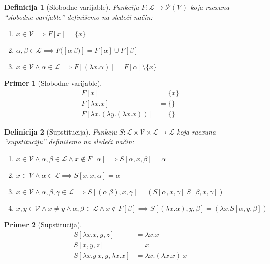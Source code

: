 \documentclass[10pt,a4paper,oneside]{article}
\newtheorem*{definition}{Definicija}
\newtheorem*{primer}{Primer}
\begin{document}
    \begin{definition}[Slobodne varijable]
      Funkciju \(F : \mathcal{L} \to \mathcal{P}(\mathcal{V})\) koja racxuna ``slobodne varijable'' defini\v{s}emo na slede\'{c}i na\v{c}in:
      \begin{enumerate}
        \item
          \(
            x \in \mathcal{V} \implies
            F[x] = \{x\}
          \)
        \item
          \(
            \alpha, \beta \in \mathcal{L} \implies
            F([\alpha\ \beta)] = F[\alpha] \cup F[\beta]
          \)
        \item
          \(
            x \in \mathcal{V} \land
            \alpha \in \mathcal{L} \implies
            F[(\lambda x.\alpha)] = F[\alpha] \setminus \{x\}
          \)
      \end{enumerate}
    \end{definition}
    \begin{primer}[Slobodne varijable]
      \begin{align*}
        F[x] &= \{x\}\\
        F[\lambda x.x] &= \{\}\\
        F[\lambda x.(\lambda y.(\lambda x.x))] &= \{\}
      \end{align*}
    \end{primer}

    \begin{definition}[Supstitucija]
      Funkcju \(S : \mathcal{L} \times \mathcal{V} \times \mathcal{L} \to \mathcal{L}\) koja racxuna ``supstituciju'' defini\v{s}emo na slede\'{c}i na\v{c}in:
      \begin{enumerate}
        \item
          \(
            x \in \mathcal{V} \land
            \alpha, \beta \in \mathcal{L} \land
            x \notin F[\alpha] \implies
            S[\alpha, x, \beta] = \alpha
          \)
        \item
          \(
            x \in \mathcal{V} \land
            \alpha \in \mathcal{L} \implies
            S[x, x, \alpha] = \alpha
          \)
        \item
          \(
            x \in \mathcal{V} \land
            \alpha, \beta, \gamma \in \mathcal{L} \implies
            S[(\alpha\ \beta), x, \gamma] = (S[\alpha, x, \gamma]\ S[\beta, x, \gamma])
          \)
        \item
          \(
            x, y \in \mathcal{V} \land
            x \neq y \land
            \alpha, \beta \in \mathcal{L} \land
            x \notin F[\beta] \implies
            S[(\lambda x.\alpha), y, \beta] = (\lambda x.S[\alpha, y, \beta])
          \)
      \end{enumerate}
    \end{definition}
    \begin{primer}[Supstitucija]
      \begin{align*}
        S[\lambda x.x, y, z] &= \lambda x.x\\
        S[x, y, z] &= x\\
        S[\lambda x.y\ x, y, \lambda x.x] &= \lambda x.(\lambda x.x)\ x
      \end{align*}
    \end{primer}
\end{document}
